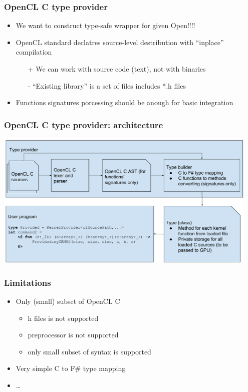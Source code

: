 \documentclass[xcolor=table]{beamer}
\begin{document}
\begin{frame}
  \transwipe[direction=90]
  \frametitle{OpenCL C type provider}
\begin{itemize}
\item We want to construct type-safe wrapper for given Open!!!!
\item OpenCL standard declatres source-level destribution with ``inplace'' compilation
\begin{itemize}
\item[+] We can work with source code (text), not with binaries
\item[-] ``Existing library'' is a set of files includes *.h files
\end{itemize}
\item Functions signatures porcessing should be anough for basic integration
\end{itemize}
\end{frame}
 
\begin{frame}
  \transwipe[direction=90]
  \frametitle{OpenCL C type provider: architecture}
    
  \includegraphics[width=0.95\textwidth]{pictures/OpenCL_C_TP.pdf}
  \\
  \pause
\end{frame}

\begin{frame}
  \transwipe[direction=90]
  \frametitle{Limitations}
\begin{itemize}
\item Only (small) subset of OpenCL C
 \begin{itemize}
 \item h files is not supported
 \item preprocessor is not supported
 \item only small subset of syntax is supported
  \end{itemize}
\item Very simple C to F\# type mapping
\item \dots
\end{itemize}

\end{frame}
\end{document}
